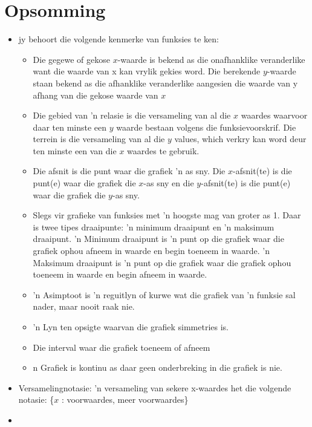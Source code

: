 
\section{Opsomming}


\summary

\begin{itemize}[noitemsep]
\item jy behoort die volgende kenmerke van funksies te ken: 
\begin{itemize}[noitemsep]
\item Die gegewe of gekose $x$-waarde is bekend as die onafhanklike veranderlike want die waarde van x kan
vrylik gekies word. Die berekende $y$-waarde staan bekend as die afhanklike veranderlike aangesien
die waarde van y afhang van die gekose waarde van $x$
\item Die gebied van ’n relasie is die versameling van al die $x$ waardes waarvoor daar ten minste een $y$ waarde bestaan volgens die funksievoorskrif. Die terrein is die versameling van al die $y$ values,
 which verkry kan word deur ten minste een van die $x$ waardes te gebruik.
\item Die afsnit is die punt waar die grafiek ’n as sny. Die $x$-afsnit(te) is die punt(e) waar die grafiek die $x$-as
sny en die $y$-afsnit(te) is die punt(e) waar die grafiek die $y$-as sny. 
\item Slegs vir grafieke van funksies met ’n hoogste mag van groter as 1. Daar is twee tipes draaipunte: ’n
minimum draaipunt en ’n maksimum draaipunt. ’n Minimum draaipunt is ’n punt op die grafiek waar
die grafiek ophou afneem in waarde en begin toeneem in waarde. ’n Maksimum draaipunt is ’n punt
op die grafiek waar die grafiek ophou toeneem in waarde en begin afneem in waarde. 
\item ’n Asimptoot is ’n reguitlyn of kurwe wat die grafiek van ’n funksie sal nader, maar nooit raak nie.
\item ’n Lyn ten opsigte waarvan die grafiek simmetries is.
\item Die interval waar die grafiek toeneem of afneem
\item n Grafiek is kontinu as daar geen onderbreking in die grafiek is nie. 
\end{itemize}
\item 
Versamelingnotasie: ’n versameling van sekere x-waardes het die volgende notasie: \{$x$ : voorwaardes,
meer voorwaardes\}
\item 


\end{itemize}

